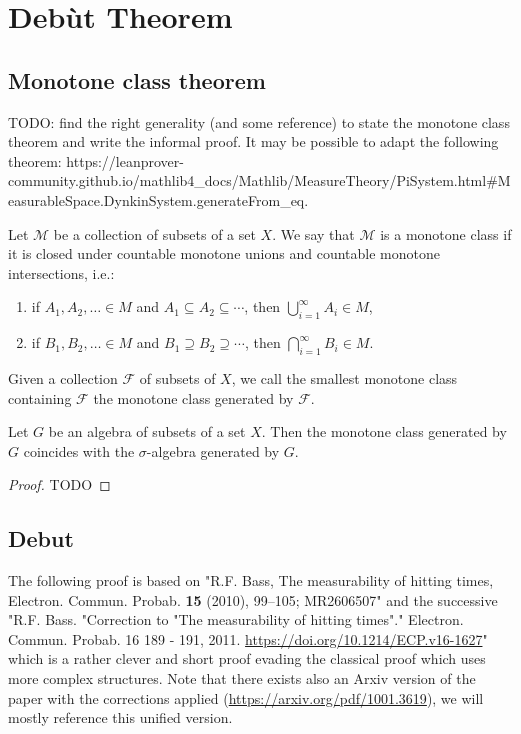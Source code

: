 \chapter{Debùt Theorem}
\label{chap:debut_theorem}

\section{Monotone class theorem}

TODO: find the right generality (and some reference) to state the monotone class theorem and write the informal proof. It may be possible to adapt the following theorem: https://leanprover-community.github.io/mathlib4_docs/Mathlib/MeasureTheory/PiSystem.html#MeasurableSpace.DynkinSystem.generateFrom_eq.

\begin{definition}\label{def:monotone_class}
  Let $\mathcal{M}$ be a collection of subsets of a set $X$. We say that $\mathcal{M}$ is a monotone class if it is closed under countable monotone unions and countable monotone intersections, i.e.:
  \begin{enumerate}
    \item if \( A_1, A_2, \ldots \in M \) and \( A_1 \subseteq A_2 \subseteq \cdots \), then
    \( \bigcup_{i=1}^\infty A_i \in M \),
    \item if \( B_1, B_2, \ldots \in M \) and \( B_1 \supseteq B_2 \supseteq \cdots \), then
    \( \bigcap_{i=1}^\infty B_i \in M \).
  \end{enumerate}
  Given a collection $\mathcal{F}$ of subsets of $X$, we call the smallest monotone class containing $\mathcal{F}$ the monotone class generated by $\mathcal{F}$.
\end{definition}

\begin{theorem}\label{thm:monotone_class}
  Let \(G\) be an algebra of subsets of a set \(X\). Then the monotone class generated by \(G\) coincides with the $\sigma$-algebra generated by \(G\).
\end{theorem}

\begin{proof}
  TODO
\end{proof}

\section{Debut}
The following proof is based on "R.F. Bass, The measurability of hitting times, Electron. Commun. Probab. {\bf 15} (2010), 99--105; MR2606507"
and the successive "R.F. Bass. "Correction to "The measurability of hitting times"." Electron. Commun. Probab. 16 189 - 191, 2011. \url{https://doi.org/10.1214/ECP.v16-1627}"
which is a rather clever and short proof evading the classical proof which uses more complex structures. Note that there exists also an Arxiv version of the paper with the corrections applied (\url{https://arxiv.org/pdf/1001.3619}), we will mostly reference this unified version.


